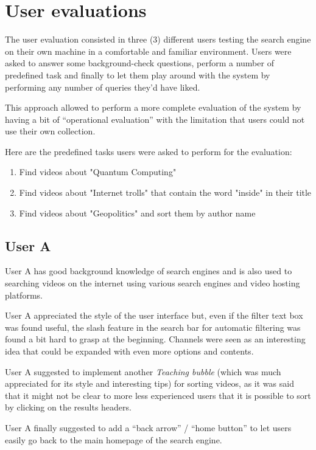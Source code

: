 \documentclass[12pt]{exam}
\begin{document}
\newpage

\section{User evaluations}

The user evaluation consisted in three (3) different users
testing the search engine on their own machine in a comfortable and
familiar environment. Users were asked to answer some background-check
questions, perform a number of predefined task and finally to let them play
around with the system by performing any number of queries they'd have liked.

This approach allowed to perform a more complete evaluation of the system by
having a bit of ``operational evaluation'' with the limitation that users could
not use their own collection.

Here are the predefined tasks users were asked to perform for the evaluation:

\begin{enumerate}
\item Find videos about "Quantum Computing"
\item Find videos about "Internet trolls" that contain the word "inside" 
      in their title
\item Find videos about "Geopolitics" and sort them by author name
\end{enumerate}
\subsection{User A}

User A has good background knowledge of search engines and is also used to
searching videos on the internet using various search engines and video hosting
platforms.

User A appreciated the style of the user interface but, even if the
filter text box was found useful, the slash feature in the search bar for
automatic filtering was found a bit hard to grasp at the beginning. Channels
were seen as an interesting idea that could be expanded with even more options
and contents.

User A suggested to implement another \textit{Teaching bubble} (which was
much appreciated for its style and interesting tips) for sorting videos, as it
was said that it might not be clear to more less experienced users that it is
possible to sort by clicking on the results headers.

User A finally suggested to add a ``back arrow'' / ``home button'' to let
users easily go back to the main homepage of the search engine.
\end{document}
